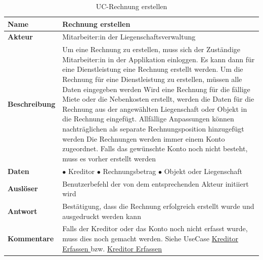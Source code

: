 \begin{table}[H]
  \centering
  \settowidth{}
  \setlength\extrarowheight{2pt}
  \begin{tabulary}{1.0\textwidth}{|a|m{14cm}|}
    \hline
    \textbf{Name}& Rechnung erstellen\\
    \hline
    \textbf{Akteur}& Mitarbeiter:in der Liegenschaftsverwaltung\\
    \hline 
    \textbf{Beschreibung} & Um eine Rechnung zu erstellen, muss sich der Zuständige Mitarbeiter:in in der Applikation einloggen. Es kann dann für eine Dienstleistung eine Rechnung erstellt werden. Um die Rechnung für eine Dienstleistung zu erstellen, müssen alle Daten eingegeben werden \newline 
    Wird eine Rechnung für die fällige Miete oder die Nebenkosten erstellt, werden die Daten für die Rechnung aus der angewählten Liegenschaft oder Objekt in die Rechnung eingefügt. Allfällige Anpassungen können nachträglichen als separate Rechnungsposition hinzugefügt werden \newline
    Die Rechnungen werden immer einem Konto zugeordnet. Falls das gewünschte Konto noch nicht besteht, muss es vorher erstellt werden\\
    \hline
    \textbf{Daten} &       
      $\bullet$ Kreditor\newline
      $\bullet$ Rechnungsbetrag \newline
      $\bullet$ Objekt oder Liegenschaft\\
    \hline
    \textbf{Auslöser} & Benutzerbefehl der von dem entsprechenden Akteur initiiert wird\\
    \hline
    \textbf{Antwort} & Bestätigung, dass die Rechnung erfolgreich erstellt wurde und ausgedruckt werden kann\\
    \hline
    \textbf{Kommentare} & Falls der Kreditor oder das Konto noch nicht erfasst wurde, muss dies noch gemacht werden. Siehe UseCase \hyperref[kreditorErfassen]{Kreditor Erfassen } bzw. \hyperref[kreditorErfassen]{Kreditor Erfassen }\\
    \hline
  \end{tabulary}
  \caption{UC-Rechnung erstellen}
\end{table}

